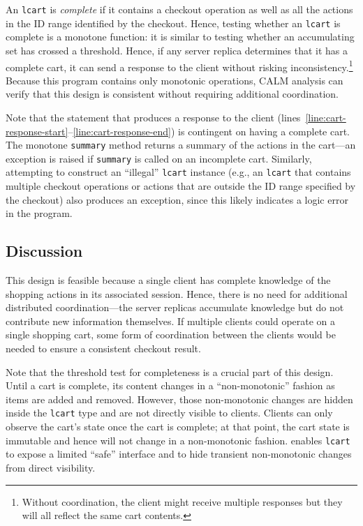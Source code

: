 An \texttt{lcart} is \emph{complete} if it contains a checkout operation as well
as all the actions in the ID range identified by the checkout. Hence, testing
whether an \texttt{lcart} is complete is a monotone function: it is similar to
testing whether an accumulating set has crossed a threshold. Hence, if any
server replica determines that it has a complete cart, it can send a response to
the client without risking inconsistency.\footnote{Without coordination, the
  client might receive multiple responses but they will all reflect the same
  cart contents.} Because this program contains only monotonic operations,
CALM analysis can verify that this design is consistent without requiring
additional coordination.

Note that the statement that produces a response to the client
(lines~\ref{line:cart-response-start}--\ref{line:cart-response-end}) is
contingent on having a complete cart. The monotone \texttt{summary} method
returns a summary of the actions in the cart---an exception is raised if
\texttt{summary} is called on an incomplete cart. Similarly, attempting to
construct an ``illegal'' \texttt{lcart} instance (e.g., an \texttt{lcart} that
contains multiple checkout operations or actions that are outside the ID range
specified by the checkout) also produces an exception, since this likely
indicates a logic error in the program.

\subsection{Discussion}
This design is feasible because a single client has complete knowledge of the
shopping actions in its associated session. Hence, there is no need for
additional distributed coordination---the server replicas accumulate knowledge
but do not contribute new information themselves. If multiple clients could
operate on a single shopping cart, some form of coordination between the clients
would be needed to ensure a consistent checkout result.

Note that the threshold test for completeness is a crucial part of this
design. Until a cart is complete, its content changes in a ``non-monotonic''
fashion as items are added and removed. However, those non-monotonic changes are
hidden inside the \texttt{lcart} type and are not directly visible to
clients. Clients can only observe the cart's state once the cart is complete; at
that point, the cart state is immutable and hence will not change in a
non-monotonic fashion. \lang enables \texttt{lcart} to expose a limited ``safe''
interface and to hide transient non-monotonic changes from direct visibility.

